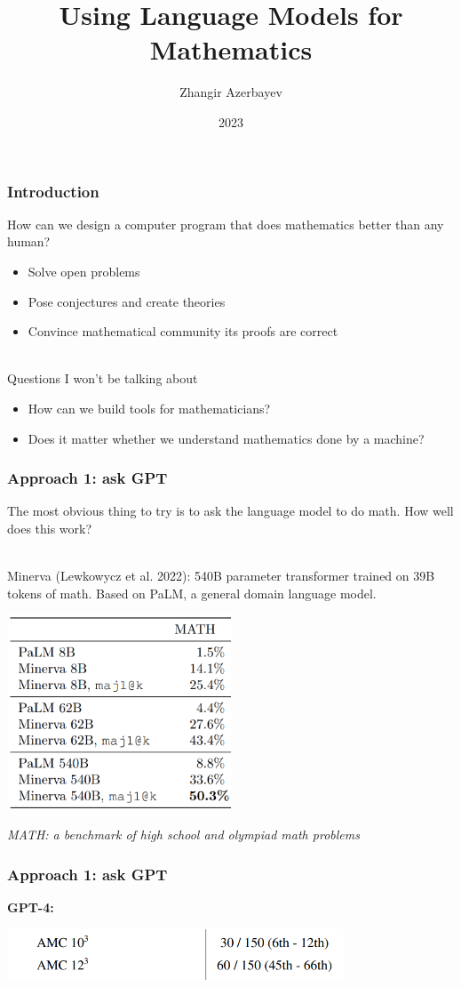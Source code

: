 \documentclass{beamer}
\title{Using Language Models for Mathematics}
\author{Zhangir Azerbayev}
\institute{Yale University}
\date{2023}
\begin{document}
\frame{\titlepage}

\begin{frame}
\frametitle{Introduction}
How can we design a computer program that does mathematics better than any human?
\begin{itemize}
    \item Solve open problems
    \item Pose conjectures and create theories
    \item Convince mathematical community its proofs are correct\\~\
\end{itemize}
\pause
Questions I won't be talking about
\begin{itemize}
    \item How can we build tools for mathematicians?
    \item Does it matter whether we understand mathematics done by a machine?
\end{itemize}
\end{frame}

\begin{frame}
\frametitle{Approach 1: ask GPT}
The most obvious thing to try is to ask the language model to do math. How well does this work?\\~\ \pause

Minerva (Lewkowycz et al. 2022): 540B parameter transformer trained on 39B tokens of math. Based on PaLM, a general domain language model.
\begin{center}
\includegraphics[width=0.5\textwidth]{img/minerva.png}
\end{center}
{\it MATH: a benchmark of high school and olympiad math problems}
\end{frame}

\begin{frame}
\frametitle{Approach 1: ask GPT}
{\bf GPT-4:}
\begin{center}
    \includegraphics[width=0.75\textwidth]{img/gpt4.png} 
\end{center}
\end{frame}
\end{document}
